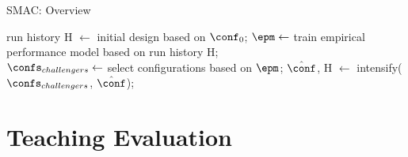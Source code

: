 \begin{frame}[c]{SMAC: Overview}

\LinesNotNumbered
\begin{algorithm}[H]
	\BlankLine
	run history H $\leftarrow$ initial design based on $\conf_0$; 
	 {
		$\epm \leftarrow$ train empirical performance model based on run history H;\\
		$\confs_{challengers} \leftarrow$ select configurations based on $\epm$;  
		$\hat{\conf}$, H $\leftarrow$ intensify($\confs_{challengers}$, $\hat{\conf}$); 
	}
	\Return{$\hat{\conf}$}
	\caption{SMAC}
\end{algorithm}

\end{frame}
\section{Teaching Evaluation}

